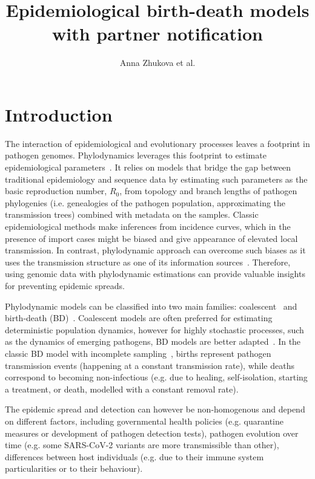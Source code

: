 \documentclass[a4paper,10pt]{article}
\title{Epidemiological birth-death models with partner notification}
\author{Anna Zhukova et al.}
\begin{document}
\maketitle

%

\section{Introduction}
The interaction of epidemiological and evolutionary processes leaves a footprint in pathogen genomes. Phylodynamics leverages this footprint to estimate epidemiological parameters~\citep{Grenfell2004a,Volz2013}. It relies on models that bridge the gap between traditional epidemiology and sequence data by estimating such parameters as the basic reproduction number, $R_0$, from topology and branch lengths of pathogen phylogenies (i.e. genealogies of the pathogen population, approximating the transmission trees) combined with metadata on the samples. Classic epidemiological methods make inferences from incidence curves, which in the presence of import cases might be biased and give appearance of elevated local transmission. In contrast, phylodynamic approach can overcome such biases as it uses the transmission structure as one of its information sources~\citep{vaughanEstimatesEarlyOutbreakspecific2024}. Therefore, using genomic data with phylodynamic estimations can provide valuable insights for preventing epidemic spreads.


Phylodynamic models can be classified into two main families:  coalescent~\citep{Volz2009a,Drummond2005,Pybus2000a} and birth-death (BD)~\citep{Kendall1948,Maddison2007,Stadler2009,Stadler2010}. Coalescent models are often preferred for estimating deterministic population dynamics, however for highly stochastic processes, such as the dynamics of emerging pathogens, BD models are better adapted~\citep{Macpherson2021}. In the classic BD model with incomplete sampling~\citep{Stadler2009}, births represent pathogen transmission events (happening at a constant transmission rate), while deaths correspond to becoming non-infectious (e.g. due to healing, self-isolation, starting a treatment, or death, modelled with a constant removal rate). 

The epidemic spread and detection can however be non-homogenous and depend on different factors, including governmental health policies (e.g. quarantine measures or development of pathogen detection tests), pathogen evolution over time (e.g. some SARS-CoV-2 variants are more transmissible than other),  differences between host individuals (e.g. due to their immune system particularities or to their behaviour).
\end{document}

